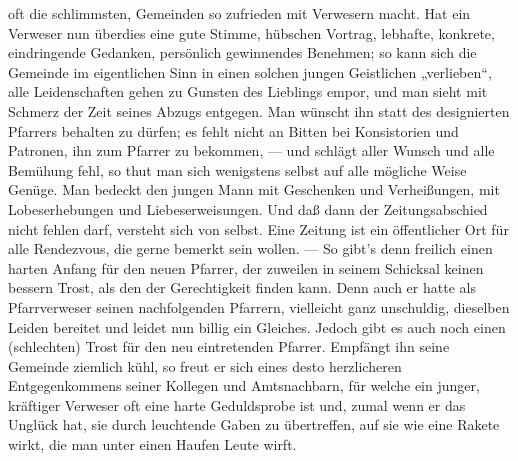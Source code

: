 oft die schlimmsten, Gemeinden so zufrieden mit Verwesern macht. Hat ein Verweser nun überdies eine gute Stimme, hübschen Vortrag, lebhafte, konkrete, eindringende Gedanken, persönlich gewinnendes Benehmen; so kann sich die Gemeinde im eigentlichen Sinn in einen solchen jungen Geistlichen „verlieben“, alle Leidenschaften gehen zu Gunsten des Lieblings empor, und man sieht mit Schmerz der Zeit seines Abzugs entgegen. Man wünscht ihn statt des designierten Pfarrers behalten zu dürfen; es fehlt nicht an Bitten bei Konsistorien und Patronen, ihn zum Pfarrer zu bekommen, — und schlägt aller Wunsch und alle Bemühung fehl, so thut man sich wenigstens selbst auf alle mögliche Weise Genüge. Man bedeckt den jungen Mann mit Geschenken und Verheißungen, mit Lobeserhebungen und Liebeserweisungen. Und daß dann der Zeitungsabschied nicht fehlen darf, versteht sich von selbst. Eine Zeitung ist ein öffentlicher Ort für alle Rendezvous, die gerne bemerkt sein wollen. — So gibt’s denn freilich einen harten Anfang für den neuen Pfarrer, der zuweilen in seinem Schicksal keinen bessern Trost, als den der Gerechtigkeit finden kann. Denn auch er hatte als Pfarrverweser seinen nachfolgenden Pfarrern, vielleicht ganz unschuldig, dieselben Leiden bereitet und leidet nun billig ein Gleiches. Jedoch gibt es auch noch einen (schlechten) Trost für den neu eintretenden Pfarrer. Empfängt ihn seine Gemeinde ziemlich kühl, so freut er sich eines desto herzlicheren Entgegenkommens seiner Kollegen und Amtsnachbarn, für welche ein junger, kräftiger Verweser oft eine harte Geduldsprobe ist und, zumal wenn er das Unglück hat, sie durch leuchtende Gaben zu übertreffen,
auf sie wie eine Rakete wirkt, die man unter einen Haufen Leute wirft.

